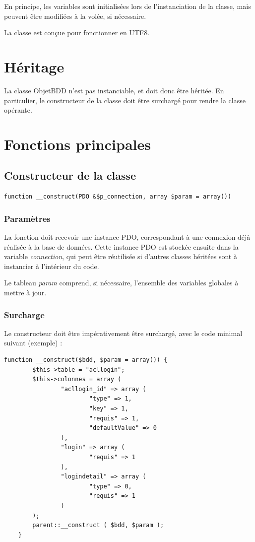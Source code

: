 En principe, les variables sont initialisées lors de l'instanciation de la classe, mais peuvent être modifiées à la volée, si nécessaire.

La classe est conçue pour fonctionner en UTF8.

\section{Héritage}

La classe ObjetBDD n'est pas instanciable, et doit donc être héritée. En particulier, le constructeur de la classe doit être surchargé pour rendre la classe opérante. 

\section{Fonctions principales}
\subsection{Constructeur de la classe}

\begin{lstlisting}
function __construct(PDO &$p_connection, array $param = array())
\end{lstlisting}
\subsubsection{Paramètres}
La fonction doit recevoir une instance PDO, correspondant à une connexion déjà réalisée à la base de données. Cette instance PDO est stockée ensuite dans la variable \textit{connection}, qui peut être réutilisée si d'autres classes héritées sont à instancier à l'intérieur du code.

Le tableau \textit{param} comprend, si nécessaire, l'ensemble des variables globales à mettre à jour.

\subsubsection{Surcharge}

Le constructeur doit être impérativement être surchargé, avec le code minimal suivant (exemple) : 

\begin{lstlisting}
function __construct($bdd, $param = array()) {
		$this->table = "acllogin";
		$this->colonnes = array (
				"acllogin_id" => array (
						"type" => 1,
						"key" => 1,
						"requis" => 1,
						"defaultValue" => 0 
				),
				"login" => array (
						"requis" => 1 
				),
				"logindetail" => array (
						"type" => 0,
						"requis" => 1 
				) 
		);
		parent::__construct ( $bdd, $param );
	}
\end{lstlisting}

